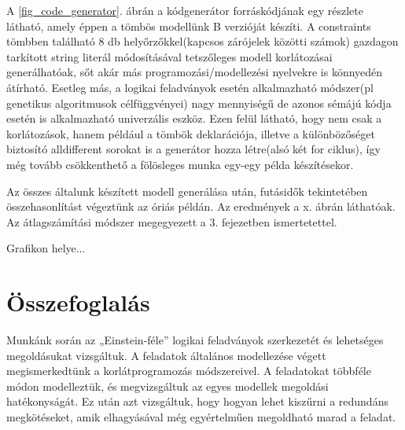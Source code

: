 \documentclass[12pt,a4paper,twoside, openright]{report}
\begin{document}
    
    A \ref{fig_code_generator}. ábrán a kódgenerátor forráskódjának egy részlete látható, amely éppen a tömbös modellünk B verzióját készíti. A constraints tömbben található 8 db helyőrzőkkel(kapcsos zárójelek közötti számok) gazdagon tarkított string literál módosításával tetszőleges modell korlátozásai generálhatóak, sőt akár más programozási/modellezési nyelvekre is könnyedén átírható. Esetleg más, a logikai feladványok esetén alkalmazható módszer(pl genetikus algoritmusok célfüggvényei) nagy mennyiségű de azonos sémájú kódja esetén is alkalmazható univerzális eszköz. Ezen felül látható, hogy nem csak a korlátozások, hanem például a tömbök deklarációja, illetve a különbözőséget biztosító alldifferent sorokat is a generátor hozza létre(alsó két for ciklus), így még tovább csökkenthető a fölösleges munka egy-egy példa készítésekor.
    
    Az összes általunk készített modell generálása után, futásidők tekintetében összehasonlítást végeztünk az óriás példán. Az eredmények a x. ábrán láthatóak. Az átlagszámítási módszer megegyezett a  3. fejezetben ismertetettel.
    
    Grafikon helye...


\chapter{Összefoglalás}

    Munkánk során az „Einstein-féle” logikai feladványok szerkezetét és lehetséges megoldásukat vizsgáltuk.
    A feladatok általános modellezése végett megismerkedtünk a korlátprogramozás módszereivel.
    A feladatokat többféle módon modelleztük, és megvizsgáltuk az egyes modellek megoldási hatékonyságát.
    Ez után azt vizsgáltuk, hogy hogyan lehet kiszűrni a redundáns megkötéseket, amik elhagyásával még egyértelműen megoldható marad a feladat.
			


				
				
\end{document}
